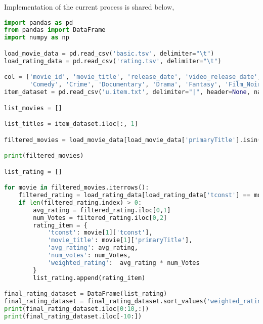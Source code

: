 \documentclass[12pt]{article}
\begin{document}
Implementation of the current process is shared below, 
\begin{lstlisting}[language=Python, caption=Ranking the movies] 
import pandas as pd
from pandas import DataFrame
import numpy as np

load_movie_data = pd.read_csv('basic.tsv', delimiter="\t")
load_rating_data = pd.read_csv('rating.tsv', delimiter="\t")

col = ['movie_id', 'movie_title', 'release_date', 'video_release_date', 'IMDb_URL', 'unknown', 'Action', 'Adventure', 'Animation', 'Childrens',
       'Comedy', 'Crime', 'Documentary', 'Drama', 'Fantasy', 'Film_Noir', 'Horror', 'Musical', 'Mystery', 'Romance', 'Sci_Fi', 'Thriller', 'War', 'Western']
item_dataset = pd.read_csv('u.item.txt', delimiter="|", header=None, names=col)

list_movies = []

list_titles = item_dataset.iloc[:, 1]

filtered_movies = load_movie_data[load_movie_data['primaryTitle'].isin(list_titles)]

print(filtered_movies)

list_rating = []

for movie in filtered_movies.iterrows():
    filtered_rating = load_rating_data[load_rating_data['tconst'] == movie[1]['tconst']]
    if len(filtered_rating.index) > 0:
        avg_rating = filtered_rating.iloc[0,1]
        num_Votes = filtered_rating.iloc[0,2]
        rating_item = { 
            'tconst': movie[1]['tconst'], 
            'movie_title': movie[1]['primaryTitle'],
            'avg_rating': avg_rating,
            'num_votes': num_Votes,
            'weighted_rating':  avg_rating * num_Votes
        }
        list_rating.append(rating_item)

final_rating_dataset = DataFrame(list_rating)
final_rating_dataset = final_rating_dataset.sort_values('weighted_rating', ascending=False)
print(final_rating_dataset.iloc[0:10,:])
print(final_rating_dataset.iloc[-10:])
\end{lstlisting}
\end{document}
